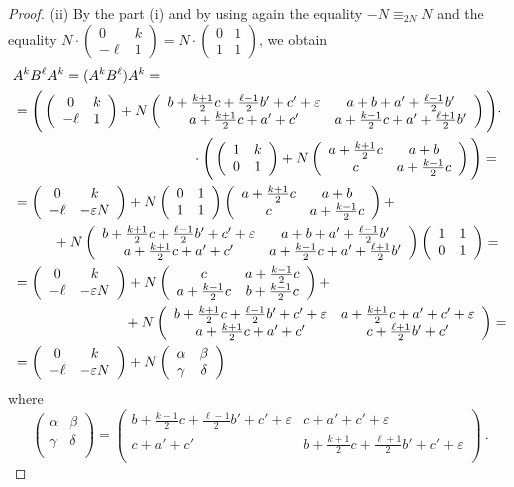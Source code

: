 \documentclass[10pt]{amsart}
\theoremstyle{plain}
\theoremstyle{definition}
\theoremstyle{remark}%
\newcommand{\mat}[4]{\left(\begin{array}{cc}
 #1 & #2\\
 #3 & #4\\
\end{array}\right)}
\begin{document}
\begin{proof}
 (ii) By the part (i) and by using again the equality $-N\equiv_{2N}N$ and the equality $N\cdot(\begin{smallmatrix}0 & k\\ -\ell & 1\end{smallmatrix})=N\cdot(\begin{smallmatrix}0 & 1\\ 1 & 1\end{smallmatrix})$, we obtain
 \begin{align*}
 &A^k B^{\ell}A^k=(A^k B^{\ell})A^k=\\
 &=\Bigg(\mat{0}{k}{-\ell}{1}+
 N\mat{b+\frac{k+1}{2}c+\frac{\ell-1}{2}b'+c'+\varepsilon}{a+b+a'+\frac{\ell-1}{2}b'}{a+\frac{k+1}{2}c+a'+c'}{a+\frac{k-1}{2}c+a'+\frac{\ell+1}{2}b'}\Bigg)\cdot\\
 &\hspace{45mm}\cdot\Bigg(\mat{1}{k}{0}{1}+N\mat{a+\frac{k+1}{2}c}{a+b}{c}{a+\frac{k-1}{2}c}\Bigg)=\\
  &=\mat{0}{k}{-\ell}{-\varepsilon N}+
 N\mat{0}{1}{1}{1}\mat{a+\frac{k+1}{2}c}{a+b}{c}{a+\frac{k-1}{2}c}+\\
 &\hspace{10mm}+N\mat{b+\frac{k+1}{2}c+\frac{\ell-1}{2}b'+c'+\varepsilon}{a+b+a'+\frac{\ell-1}{2}b'}{a+\frac{k+1}{2}c+a'+c'}{a+\frac{k-1}{2}c+a'+\frac{\ell+1}{2}b'}\mat{1}{1}{0}{1}=\\
 &=\mat{0}{k}{-\ell}{-\varepsilon N}
+N\mat{c}{a+\frac{k-1}{2}c}{a+\frac{k-1}{2}c}{b+\frac{k-1}{2}c}+\\
 &\hspace{28mm}+ N\mat{b+\frac{k+1}{2}c+\frac{\ell-1}{2}b'+c'+\varepsilon}{a+\frac{k+1}{2}c+a'+c'+\varepsilon}{a+\frac{k+1}{2}c+a'+c'}{c+\frac{\ell+1}{2}b'+c'}=\\
 &=\mat{0}{k}{-\ell}{-\varepsilon N}+N\mat{\alpha}{\beta}{\gamma}{\delta}
 \end{align*}
 where $$\mat{\alpha}{\beta}{\gamma}{\delta}=\mat{b+\frac{k-1}{2}c+\frac{\ell-1}{2}b'+c'+\varepsilon}{c+a'+c'+\varepsilon}{c+a'+c'}{b+\frac{k+1}{2}c+\frac{\ell+1}{2}b'+c'+\varepsilon}\ .$$


\end{proof}
\end{document}

